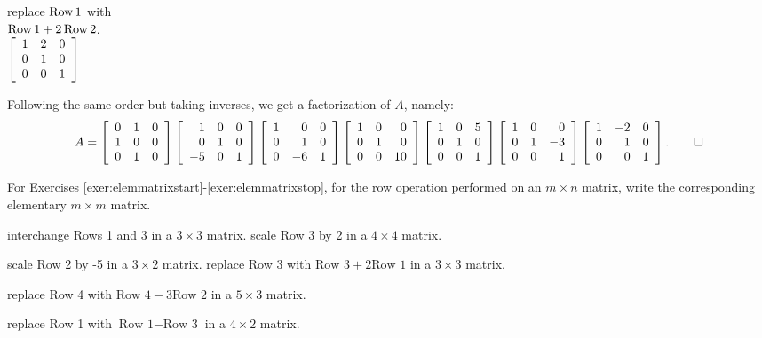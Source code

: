 \begin{Exam}
\begin{multicols}{3}
\begin{center}
replace $\row 1$ with\\ $\row 1 +2\row 2$.\\
$\mtx{rrr}{1&2&0\\0&1&0\\0&0&1}$
\end{center}
\end{multicols}
Following the same order but taking inverses, we get a factorization of $A$, namely:
\[A= \mtx{rrr}{0&1&0\\1&0&0\\0&1&0}\mtx{rrr}{1&0&0\\0&1&0\\-5&0&1}\mtx{rrr}{1&0&0\\0&1&0\\0&-6&1}\mtx{rcr}{1&0&0\\0&1&0\\0&0&10}\mtx{rrr}{1&0&5\\0&1&0\\0&0&1}\mtx{rrr}{1&0&0\\0&1&-3\\0&0&1}\mtx{rrr}{1&-2&0\\0&1&0\\0&0&1}. \qedhere\]
\end{Exam}


\noindent For Exercises \ref{exer:elemmatrixstart}-\ref{exer:elemmatrixstop}, for the row operation performed on an $m\times n$ matrix, write the corresponding elementary $m\times m$ matrix. 
\begin{enumerate}[!HW!, start=1, label=$\spadesuit$ \arabic*., ref=\arabic*]
\begin{multicols}{2}
\item\label{exer:elemmatrixstart} interchange Rows 1 and 3 in a $3\times 3$ matrix.
\itemspade scale Row 3 by 2 in a $4\times 4$ matrix.
\end{multicols}
\begin{multicols}{2}
\itemspade scale Row 2 by -5 in a $3\times 2$ matrix.
\itemspade replace Row 3 with $\text{Row 3}+2\text{Row 1}$ in a $3\times 3$ matrix.
\end{multicols}
\begin{multicols}{2}
\itemspade replace Row 4 with $\text{Row 4}-3\text{Row 2}$ in a $5\times 3$ matrix.
\item\label{exer:elemmatrixstop} replace Row 1 with $\text{Row 1}-\text{Row 3}$ in a $4\times 2$ matrix.
\end{multicols}
\end{enumerate}

